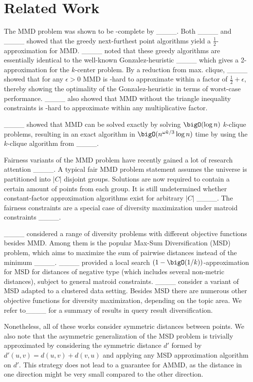 \section{Related Work}
\label{sec:related}
 The MMD problem was shown to be \NP -complete by ____.
Both ____ and ____ showed that the greedy next-furthest point algorithms yield a $\frac{1}{2}$-approximation for MMD. ____ noted that these greedy algorithms are essentially identical to the well-known Gonzalez-heuristic ____ which gives a 2-approximation for the $k$-center problem. By a reduction from max. clique, ____ showed that for any $\epsilon>0$ MMD is \NP -hard to approximate within a factor of $\frac{1}{2}+\epsilon$, thereby showing the optimality of the Gonzalez-heuristic in terms of worst-case performance.
____ also showed that MMD without the triangle inequality constraints is \NP -hard to approximate within any multiplicative factor.

____ showed that MMD can be solved exactly by solving $\bigO(\log n)$ $k$-clique problems, resulting in an exact algorithm in $\bigO(n^{\omega k/3}\log n)$ time by using the $k$-clique algorithm from ____.


 Fairness variants of the MMD problem have recently gained a lot of research attention ____.
A typical fair MMD problem statement assumes the universe is partitioned into $|C|$ disjoint groups. Solutions are now required to contain a certain amount of points from each group. It is still undetermined whether constant-factor approximation algorithms exist for arbitrary $|C|$ ____.
The fairness constraints are a special case of diversity maximization under matroid constraints ____.

 ____ considered a range of diversity problems with different objective functions besides MMD. Among them is the popular Max-Sum Diversification (MSD) problem, which aims to maximize the sum of pairwise distances instead of the minimum ____. 
____ provided a local search $(1-\bigO(1/k))$-approximation for MSD for distances of negative type (which includes several non-metric distances), subject to general matroid constraints. ____ consider a variant of MSD adapted to a clustered data setting. Besides MSD there are numerous other objective functions for diversity maximization, depending on the topic area. We refer to____ for a summary of results in query result diversification.

Nonetheless, all of these works consider symmetric distances between points. We also note that the asymmetric generalization of the MSD problem is trivially approximated by considering the symmetric distance $d'$ formed by $d'(u,v) = d(u,v)+d(v,u)$ and applying any MSD approximation algorithm on $d'$. This strategy does not lead to a guarantee for AMMD, as the distance in one direction might be very small compared to the other direction.